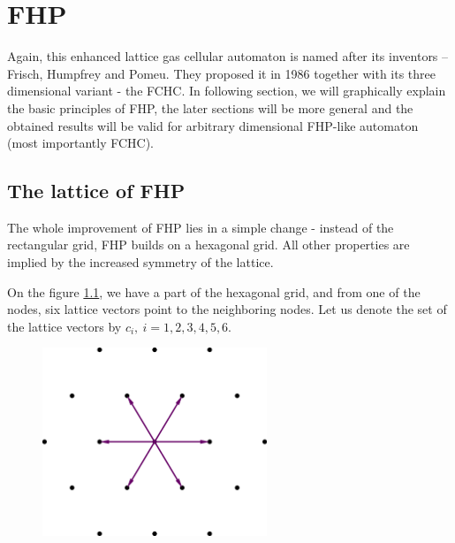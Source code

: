\chapter{FHP}
Again, this enhanced lattice gas cellular automaton is named after its inventors -- Frisch, Humpfrey and Pomeu. 
They proposed it in 1986 together with its three dimensional variant - the FCHC. 
%
In following section, we will graphically explain the basic principles of FHP, the later sections will be more general and the obtained results will be valid for arbitrary dimensional FHP-like automaton (most importantly FCHC).

\section{The lattice of FHP}
The whole improvement of FHP lies in a simple change - instead of the rectangular grid, FHP builds on a hexagonal grid. 
All other properties are implied by the increased symmetry of the lattice.

On the figure \ref{FHPgrid}, we have a part of the hexagonal grid, and from one of the nodes, six lattice vectors point to the neighboring nodes.
Let us denote the set of the lattice vectors by $c_i,~i=1,2,3,4,5,6$.


\begin{figure}[htbp] \label{FHPgrid}
 \centering
 \includegraphics[width=0.6\textwidth]{./img/fhp_desc}
\end{figure}

